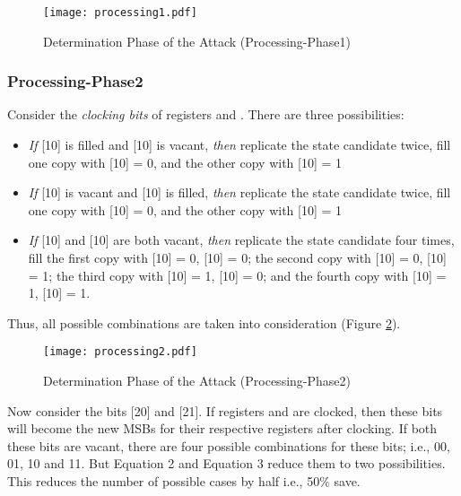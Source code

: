 \documentclass{llncs}
\begin{document}
\begin{figure}[!htb]
\begin{center}
\hspace*{-1cm}
\texttt{[image: processing1.pdf]}
\caption{Determination Phase of the Attack (Processing-Phase1)}
\label{processing1}
\end{center}
\end{figure}

\subsubsection{Processing-Phase2} Consider the \emph{clocking bits} of registers  and . There are three possibilities: 
\begin{itemize}
\item \emph{If} [10] is filled and [10] is vacant, \emph{then} replicate the state candidate twice, fill one copy with [10] = 0, and the other copy with [10] = 1
\item \emph{If} [10] is vacant and [10] is filled, \emph{then} replicate the state candidate twice, fill one copy with [10] = 0, and the other copy with [10] = 1
\item \emph{If} [10] and [10] are both vacant, \emph{then} replicate the state candidate four times, fill the first copy with [10] = 0, [10] = 0; the second copy with [10] = 0, [10] = 1; the third copy with [10] = 1, [10] = 0; and the fourth copy with [10] = 1, [10] = 1.
\end{itemize}

Thus, all possible combinations are taken into consideration (Figure \ref{processing2}).
\begin{figure}[!htb]
\begin{center}
\hspace*{-3cm}
\texttt{[image: processing2.pdf]}
\caption{Determination Phase of the Attack (Processing-Phase2)}
\label{processing2}
\end{center}
\end{figure}

Now consider the bits [20] and [21]. If registers  and  are clocked, then these bits will become the new MSBs for their respective registers after clocking. If both these bits are vacant, there are four possible combinations for these bits; i.e., 00, 01, 10 and 11. But Equation 2 and Equation 3 reduce them to two possibilities. This reduces the number of possible cases by half i.e., 50\% save.
\end{document}
